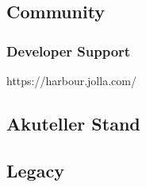 \subsection{Community}
\subsubsection{Developer Support}
https://harbour.jolla.com/

\subsection{Akuteller Stand}

\subsection{Legacy}
